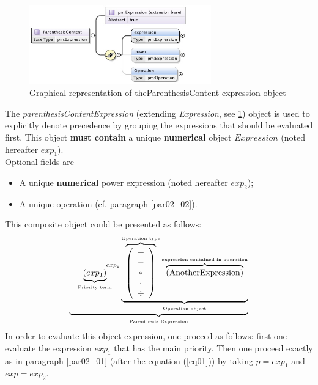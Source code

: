 \documentclass[a4paper,11pt] {article}
\begin{document}
\begin{figure}[htbp]
\begin{center}
\includegraphics[width=0.7\textwidth]{pictures/ParenthesisContent.jpg} 
\caption{Graphical representation of theParenthesisContent expression object}
\label{Pic-ParenthesisContent}
\end{center}
\end{figure}

The {\it parenthesisContentExpression} (extending {\it Expression}, see
\ref{Pic-ParenthesisContent}) object is used to explicitly denote precedence by grouping the
expressions that should be evaluated first. This object {\bf must contain} a unique {\bf numerical}
object $Expression$ (noted hereafter $exp_1$).\\
Optional fields are 
\begin{itemize}
\item A unique {\bf numerical} power expression (noted hereafter $exp_2$);
\item A unique operation (cf. paragraph \ref{par02_02}).\\
\end{itemize}
This composite object could be presented as follows:
\begin{equation}
 \underbrace{    \underbrace{ \left( exp_1\right) }_{\mbox{\tiny Priority term}} ^{\hspace{15mm}exp_2} \underbrace{  \overbrace{\left( \begin{array}{c} + \\ - \\ \ast  \\ \cdot \\ \div   \end{array} \right) }^{\mbox{\tiny Operation type}}
 \overbrace{    \left( \mbox{AnotherExpression}\right) }^{\mbox{\tiny expression contained in operation}}   }_{\mbox{\tiny Operation object}}}_{\mbox{\tiny Parenthesis Expression}}
\end{equation}
In order to evaluate this object expression, one proceed as follows: first one evaluate the
expression $exp_1$ that has the main priority. Then one proceed exactly as in paragraph
\ref{par02_01} (after the equation (\ref{eq01})) by taking $p=exp_1$ and $exp=exp_2$.
\end{document}
